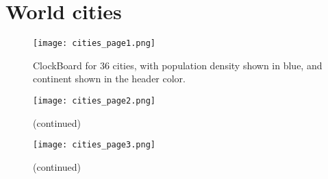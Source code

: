 \documentclass{josis}
\begin{document}
\appendix
\section{World cities}

\begin{figure}[tbh]
\centering
\texttt{[image: cities\_page1.png]}
\caption{ClockBoard for 36 cities, with population density shown in blue, and continent shown in the header color.}\label{fig:cities1}
\end{figure}

\begin{figure}[tbh]
\centering
\texttt{[image: cities\_page2.png]}
\caption{(continued)}\label{fig:cities2}
\end{figure}

\begin{figure}[tbh]
\centering
\texttt{[image: cities\_page3.png]}
\caption{(continued)}\label{fig:cities3}
\end{figure}
\end{document}
